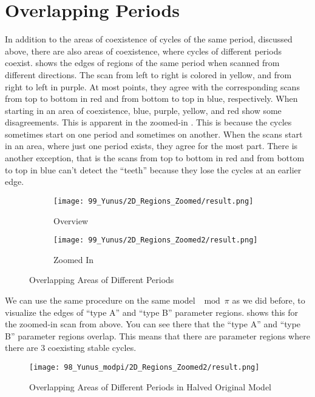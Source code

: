 \section{Overlapping Periods}

In addition to the areas of coexistence of cycles of the same period, discussed above, there are also areas of coexistence, where cycles of different periods coexist.
 shows the edges of regions of the same period when scanned from different directions.
The scan from left to right is colored in yellow, and from right to left in purple.
At most points, they agree with the corresponding scans from top to bottom in red and from bottom to top in blue, respectively.
When starting in an area of coexistence, blue, purple, yellow, and red show some disagreements.
This is apparent in the zoomed-in .
This is because the cycles sometimes start on one period and sometimes on another.
When the scans start in an area, where just one period exists, they agree for the most part.
There is another exception, that is the scans from top to bottom in red and from bottom to top in blue can't detect the ``teeth'' because they lose the cycles at an earlier edge.

\begin{figure}
    \centering
    \begin{subfigure}{0.4\textwidth}
        \texttt{[image: 99\_Yunus/2D\_Regions\_Zoomed/result.png]}
        \caption{Overview}
        \label{fig:yunus.period.regions}
    \end{subfigure}
    \begin{subfigure}{0.4\textwidth}
        \texttt{[image: 99\_Yunus/2D\_Regions\_Zoomed2/result.png]}
        \caption{Zoomed In}
        \label{fig:yunus.period.regions.zoomed}
    \end{subfigure}
    \caption{Overlapping Areas of Different Periods}
\end{figure}

We can use the same procedure on the same model $\mod \pi$ as we did before, to visualize the edges of ``type A'' and ``type B'' parameter regions.
 shows this for the zoomed-in scan from above.
You can see there that the ``type A'' and ``type B'' parameter regions overlap.
This means that there are parameter regions where there are 3 coexisting stable cycles.

\begin{figure}
    \centering
    \texttt{[image: 98\_Yunus\_modpi/2D\_Regions\_Zoomed2/result.png]}
    \caption{Overlapping Areas of Different Periods in Halved Original Model}
    \label{fig:yunus.halved.period.regions.zoomed}
\end{figure}

